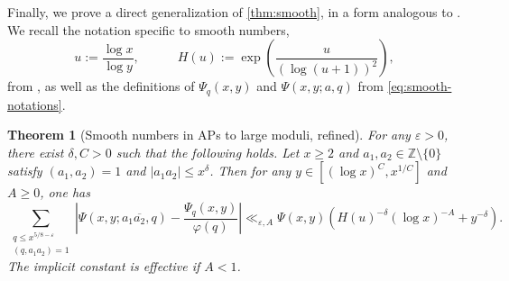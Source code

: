 \documentclass[reqno,11pt]{amsart}
\newtheorem{theorem}{Theorem}[section]
\theoremstyle{remark}
\numberwithin{equation}{section}
\newcommand{\Z}{\mathbb{Z}}
\newcommand{\eps}{\varepsilon}
\renewcommand{\bar}{\overline}
\begin{document}
Finally, we prove a direct generalization of \cref{thm:smooth}, in a form analogous to \cite[Th\'eor\`eme 1]{drappeau2015theoremes}. We recall the notation specific to smooth numbers,
\[
    u := \frac{\log x}{\log y},
    \qquad\quad 
    H(u) := \exp\left(\frac{u}{(\log (u+1))^2}\right),
\]
from \cite{drappeau2015theoremes}, as well as the definitions of $\Psi_q(x, y)$ and $\Psi(x, y; a, q)$ from \cref{eq:smooth-notations}.

\begin{theorem}[Smooth numbers in APs to large moduli, refined] \label{thm:smooth-refined}
For any $\eps > 0$, there exist $\delta, C > 0$ such that the following holds.
Let $x \ge 2$ and $a_1, a_2 \in \Z \setminus \{0\}$ satisfy $(a_1, a_2) = 1$ and $|a_1a_2| \le x^\delta$. Then for any $y \in [(\log x)^C, x^{1/C}]$ and $A \ge 0$, one has
\[
    \sum_{\substack{q \le x^{5/8-\eps} \\ (q, a_1 a_2) = 1}}
    \left\vert 
    \Psi(x, y; a_1 \bar{a_2}, q) - 
    \frac{\Psi_q(x, y)}{\varphi(q)} \right\vert 
    \ll_{\eps,A} 
    \Psi(x, y)\left( H(u)^{-\delta} (\log x)^{-A} + y^{-\delta} \right).
\]
The implicit constant is effective if $A < 1$.
\end{theorem}
\end{document}
